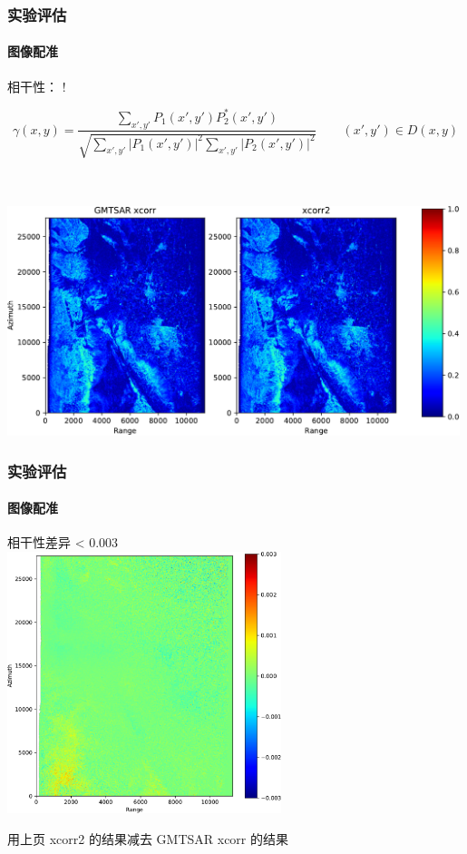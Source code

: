\documentclass{beamer}
\begin{document}
\begin{frame}
    \frametitle{实验评估}
    \framesubtitle{图像配准}

    相干性：
     {!} {
        \begin{minipage}{\linewidth}
            \begin{equation*}
                \gamma(x, y) = \frac{\sum_{x', y'} P_1(x', y') P_2^*(x', y')}{\sqrt{\sum_{x', y'}|P_1(x', y')|^2 \sum_{x', y'}|P_2(x', y')|^2}} \qquad (x', y') \in D(x, y)
            \end{equation*}
        \end{minipage}
    }
    \\~\\
    \includegraphics[width=0.99\textwidth]{figures/coh-two-color}
\end{frame}

\begin{frame}
    \frametitle{实验评估}
    \framesubtitle{图像配准}

    相干性差异 < 0.003 \\
    \centering
    \includegraphics[width=0.6\textwidth]{figures/coh-diff}
    ~\\
    \begin{scriptsize} 用上页 xcorr2 的结果减去 GMTSAR xcorr 的结果 \end{scriptsize}
\end{frame}
\end{document}
